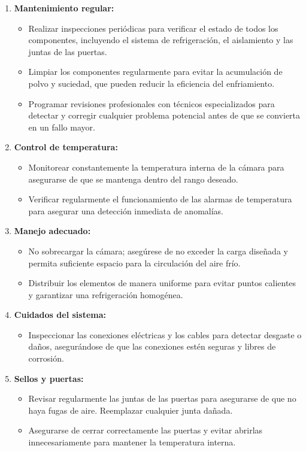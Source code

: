   \begin{enumerate}
  	\item \textbf{Mantenimiento regular:}
  	\begin{itemize}
  		\item Realizar inspecciones periódicas para verificar el estado de todos los componentes, incluyendo el sistema de refrigeración, el aislamiento y las juntas de las puertas.
  		\item Limpiar los componentes regularmente para evitar la acumulación de polvo y suciedad, que pueden reducir la eficiencia del enfriamiento.
  		\item Programar revisiones profesionales con técnicos especializados para detectar y corregir cualquier problema potencial antes de que se convierta en un fallo mayor.
  	\end{itemize}
  	
  	\item \textbf{Control de temperatura:}
  	\begin{itemize}
  		\item Monitorear constantemente la temperatura interna de la cámara para asegurarse de que se mantenga dentro del rango deseado.
  		\item Verificar regularmente el funcionamiento de las alarmas de temperatura para asegurar una detección inmediata de anomalías.
  	\end{itemize}
  	
  	\item \textbf{Manejo adecuado:}
  	\begin{itemize}
  		\item No sobrecargar la cámara; asegúrese de no exceder la carga diseñada y permita suficiente espacio para la circulación del aire frío.
  		\item Distribuir los elementos de manera uniforme para evitar puntos calientes y garantizar una refrigeración homogénea.
  	\end{itemize}
  	
  	\item \textbf{Cuidados del sistema:}
  	\begin{itemize}
  		\item Inspeccionar las conexiones eléctricas y los cables para detectar desgaste o daños, asegurándose de que las conexiones estén seguras y libres de corrosión.
  	\end{itemize}
  	
  	\item \textbf{Sellos y puertas:}
  	\begin{itemize}
  		\item Revisar regularmente las juntas de las puertas para asegurarse de que no haya fugas de aire. Reemplazar cualquier junta dañada.
  		\item Asegurarse de cerrar correctamente las puertas y evitar abrirlas innecesariamente para mantener la temperatura interna.
  	\end{itemize}
  	

\end{enumerate}
